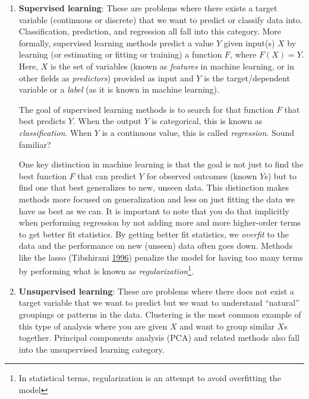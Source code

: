 \documentclass[]{krantz}
\begin{document}
\begin{enumerate}
\def\labelenumi{\arabic{enumi}.}
\item
  \textbf{Supervised learning}: These are problems where there exists a
  target variable (continuous or discrete) that we want to predict or
  classify data into. Classification, prediction, and regression all
  fall into this category. More formally, supervised learning methods
  predict a value \(Y\) given input(s) \(X\) by learning (or estimating
  or fitting or training) a function \(F\), where \(F(X) = Y\). Here,
  \(X\) is the set of variables (known as \emph{features} in machine
  learning, or in other fields as \emph{predictors}) provided as input
  and \(Y\) is the target/dependent variable or a \emph{label} (as it is
  known in machine learning).

  The goal of supervised learning methods is to search for that function
  \(F\) that best predicts \(Y\). When the output \(Y\) is categorical,
  this is known as \emph{classification}. When \(Y\) is a continuous
  value, this is called \emph{regression}. Sound familiar?

  One key distinction in machine learning is that the goal is not just
  to find the best function \(F\) that can predict \(Y\) for observed
  outcomes (known \(Y\)s) but to find one that best generalizes to new,
  unseen data. This distinction makes methods more focused on
  generalization and less on just fitting the data we have as best as we
  can. It is important to note that you do that implicitly when
  performing regression by not adding more and more higher-order terms
  to get better fit statistics. By getting better fit statistics, we
  \emph{overfit} to the data and the performance on new (unseen) data
  often goes down. Methods like the lasso (Tibshirani
  \protect\hyperlink{ref-tibshirani1996regression}{1996}) penalize the
  model for having too many terms by performing what is known as
  \emph{regularization}\footnote{In statistical terms, regularization is
    an attempt to avoid overfitting the model}.
\item
  \textbf{Unsupervised learning}: These are problems where there does
  not exist a target variable that we want to predict but we want to
  understand ``natural'' groupings or patterns in the data. Clustering
  is the most common example of this type of analysis where you are
  given \(X\) and want to group similar \(X\)s together. Principal
  components analysis (PCA) and related methods also fall into the
  unsupervised learning category.
\end{enumerate}
\end{document}
